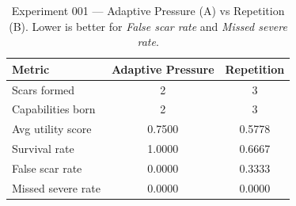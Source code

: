 \begin{table}[h]
\centering
\caption{Experiment 001 — Adaptive Pressure (A) vs Repetition (B).
Lower is better for \textit{False scar rate} and \textit{Missed severe rate}.}
\label{tab:exp001}
\begin{tabular}{lcc}
\hline
\textbf{Metric} & \textbf{Adaptive Pressure} & \textbf{Repetition} \\
\hline
Scars formed        & 2      & 3      \\
Capabilities born   & 2      & 3      \\
Avg utility score   & 0.7500 & 0.5778 \\
Survival rate       & 1.0000 & 0.6667 \\
False scar rate     & 0.0000 & 0.3333 \\
Missed severe rate  & 0.0000 & 0.0000 \\
\hline
\end{tabular}
\end{table}
